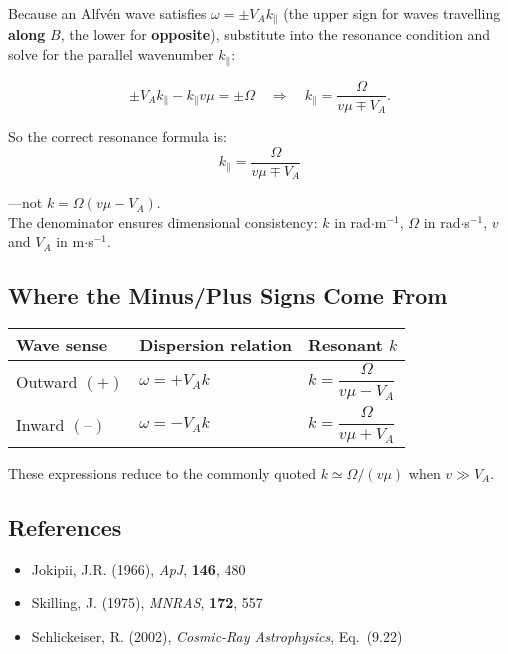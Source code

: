 Because an Alfvén wave satisfies $\omega = \pm V_A k_\parallel$ (the upper sign for waves travelling \textbf{along} $B$, the lower for \textbf{opposite}), substitute into the resonance condition and solve for the parallel wavenumber $k_\parallel$:

\[
\pm V_A k_\parallel - k_\parallel v \mu = \pm \Omega
\quad \Longrightarrow \quad
k_\parallel = \frac{\Omega}{v \mu \mp V_A} .
\]

So the correct resonance formula is:
\[
\boxed{
k_\parallel = \frac{\Omega}{v \mu \mp V_A}
}
\]

—not $k = \Omega (v \mu - V_A)$. \\
The denominator ensures dimensional consistency: $k$ in rad$\cdot$m$^{-1}$, $\Omega$ in rad$\cdot$s$^{-1}$, $v$ and $V_A$ in m$\cdot$s$^{-1}$.

\subsection*{Where the Minus/Plus Signs Come From}

\begin{center}
\begin{tabular}{@{}lll@{}}
\toprule
\textbf{Wave sense} & \textbf{Dispersion relation} & \textbf{Resonant $k$} \\
\midrule
Outward $(+)$ & $\omega = +V_A k$ & $k = \dfrac{\Omega}{v\mu - V_A}$ \\
Inward $(–)$  & $\omega = -V_A k$ & $k = \dfrac{\Omega}{v\mu + V_A}$ \\
\bottomrule
\end{tabular}
\end{center}

These expressions reduce to the commonly quoted $k \simeq \Omega/(v\mu)$ when $v \gg V_A$.

\subsection*{References}

\begin{itemize}
  \item Jokipii, J.R. (1966), \emph{ApJ}, \textbf{146}, 480
  \item Skilling, J. (1975), \emph{MNRAS}, \textbf{172}, 557
  \item Schlickeiser, R. (2002), \emph{Cosmic-Ray Astrophysics}, Eq.~(9.22)
\end{itemize}

\bigskip

